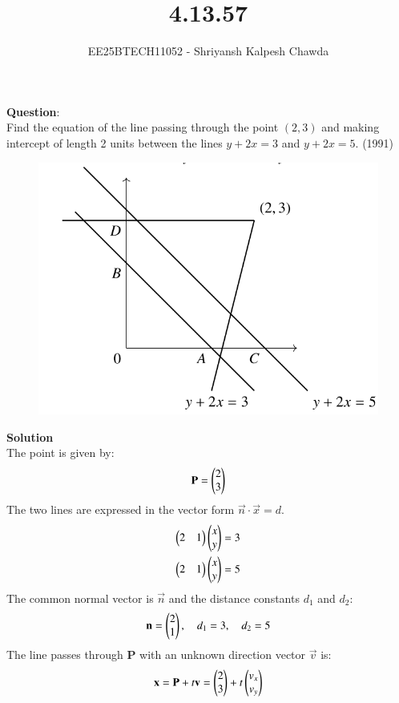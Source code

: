 \documentclass[journal]{IEEEtran}
\begin{document}
	
	
	\vspace{3cm}
	
	\title{4.13.57}
	\author{EE25BTECH11052 - Shriyansh Kalpesh Chawda}
	
	{\let\newpage\relax\maketitle}
	
	\renewcommand{\thefigure}{\theenumi}
	\renewcommand{\thetable}{\theenumi}
	\setlength{\intextsep}{10pt} 
	
	\renewcommand{\thetable}{\theenumi}
	\textbf{Question}:\\
Find the equation of the line passing through the point $(2,3)$ and making intercept of length 2 units between the lines $y + 2x = 3$ and $y + 2x = 5$. 
\hfill(1991)
\begin{figure}[H]
	\centering
	\includegraphics[width=0.4\linewidth]{figs/question}
	\caption{}
	\label{fig:question}
\end{figure}
\textbf{Solution}\\
The point is given by:
\[ \mathbf{P} = \begin{pmatrix}2 \\ 3\end{pmatrix} \]
The two lines are expressed in the vector form $\vec{n} \cdot \vec{x} = d$.
\begin{align}
	\begin{pmatrix}2 & 1\end{pmatrix} \begin{pmatrix}x \\ y\end{pmatrix} = 3 \\
	\begin{pmatrix}2 & 1\end{pmatrix} \begin{pmatrix}x \\ y\end{pmatrix} = 5
\end{align}
The common normal vector is $\vec{n}$ and the distance constants $d_1$ and $d_2$:
\begin{align}
\mathbf{n} = \begin{pmatrix}2 \\ 1\end{pmatrix}, \quad d_1 = 3, \quad d_2 = 5 \end{align}
The line passes through $\mathbf{P}$ with an unknown direction vector $\vec{v}$ is:
\begin{align} \mathbf{x} = \mathbf{P} + t\mathbf{v} = \begin{pmatrix}2 \\ 3\end{pmatrix} + t \begin{pmatrix}v_x \\ v_y\end{pmatrix} \end{align}
\end{document}
